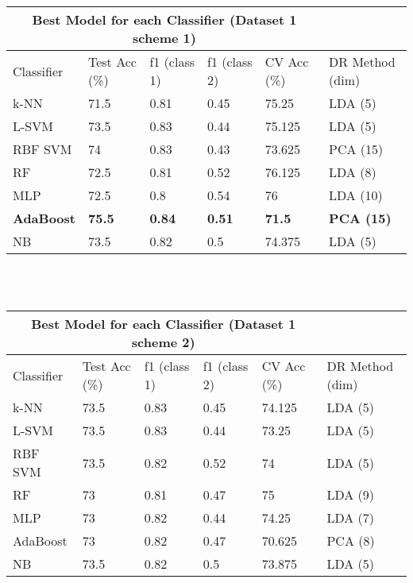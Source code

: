 \documentclass[11pt,a4paper]{article}
\begin{document}
 \label{tab:title} 
\begin{tabular}{llllll}
\hline
  \multicolumn{5}{c}{Best Model for each Classifier (Dataset 1 scheme 1)} \\
  \hline
Classifier  & Test Acc (\%) & f1 (class 1) & f1 (class 2) & CV Acc (\%)& DR Method (dim)\\
\hline
 k-NN		&71.5	&0.81	&0.45	&75.25	&LDA (5) \\
 L-SVM		&73.5	&0.83	&0.44	&75.125	&LDA (5) \\
 RBF SVM	&74		&0.83	&0.43	&73.625	&PCA (15)\\
RF			&72.5	&0.81	&0.52	&76.125	&LDA (8) \\
 MLP			&72.5	&0.8		&0.54	&76		&LDA (10)\\
 \textbf{AdaBoost}		&\textbf{75.5}	&\textbf{0.84}	&\textbf{0.51}	&\textbf{71.5}	&\textbf{PCA (15)}\\
 NB			&73.5	&0.82	&0.5		&74.375	&LDA (5)\\
\end{tabular}
\\
\\
\newpage
{} \label{tab:title} 
\begin{tabular}{llllll}
\hline
  \multicolumn{5}{c}{Best Model for each Classifier (Dataset 1 scheme 2)} \\
  \hline
Classifier  & Test Acc (\%) & f1 (class 1) & f1 (class 2) & CV Acc (\%)& DR Method (dim)\\
\hline
 k-NN		&73.5	&0.83	&0.45	&74.125	&LDA (5)\\
 L-SVM		&73.5	&0.83	&0.44	&73.25	&LDA (5)\\
 RBF SVM	&73.5	&0.82	&0.52	&74		&LDA (5)\\
 RF			&73		&0.81	&0.47	&75		&LDA (9)\\
 MLP			&73		&0.82	&0.44	&74.25	&LDA (7)\\
 AdaBoost		&73		&0.82	&0.47	&70.625	&PCA (8)\\
 NB			&73.5	&0.82	&0.5		&73.875	&LDA (5)\\
 
\end{tabular}
\\
\\
\end{document}
